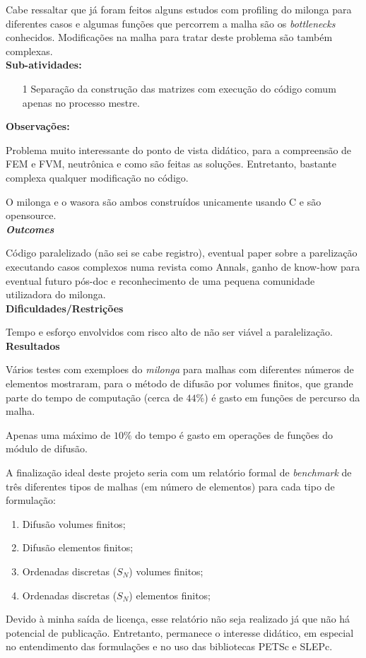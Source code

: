 Cabe ressaltar que já foram feitos alguns estudos com profiling do milonga para 
diferentes casos e algumas funções que percorrem a malha são os \textit{bottlenecks} conhecidos. Modificações na malha para tratar deste problema 
são também complexas.\\

\textbf{Sub-atividades:}

\begin{itemize}
	\item[1] Separação da construção das matrizes com execução do código comum 
	apenas no processo mestre.
\end{itemize}

\textbf{Observações:}

Problema muito interessante do ponto de vista didático, para a compreensão 
de FEM e FVM, neutrônica e como são feitas as soluções. Entretanto, bastante 
complexa qualquer modificação no código.

O milonga e o wasora são ambos construídos unicamente usando C e são opensource.\\

\textbf{\textit{Outcomes}}

Código paralelizado (não sei se cabe registro), eventual paper sobre a parelização 
executando casos complexos numa revista como Annals, ganho de know-how para eventual futuro pós-doc e reconhecimento de uma pequena comunidade utilizadora 
do milonga.\\

\textbf{Dificuldades/Restrições}

Tempo e esforço envolvidos com risco alto de não ser viável a paralelização.\\

\textbf{Resultados}

Vários testes com exemploes do \textit{milonga} para malhas com diferentes números de elementos mostraram, para o método de difusão por volumes finitos, que grande parte 
do tempo de computação (cerca de $44\%$) é gasto em funções de percurso da malha.

Apenas uma máximo de $10\%$ do tempo é gasto em operações de funções do módulo 
de difusão. 

A finalização ideal deste projeto seria com um relatório formal de \textit{benchmark} de três diferentes tipos de malhas (em número de elementos) 
para cada tipo de formulação:

\begin{enumerate}
\item Difusão volumes finitos;
\item Difusão elementos finitos;
\item Ordenadas discretas ($S_N$) volumes finitos;
\item Ordenadas discretas ($S_N$) elementos finitos;
\end{enumerate}

Devido à minha saída de licença, esse relatório não seja realizado já que não há 
potencial de publicação. Entretanto, permanece o interesse didático, em especial no entendimento das formulações e no uso das bibliotecas PETSc e SLEPc.
